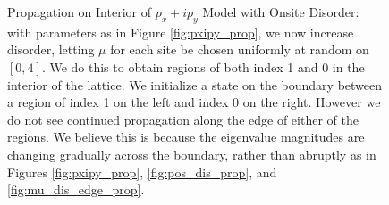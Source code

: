 \documentclass[a4paper]{article}
\begin{document}
\begin{figure}
%
%

%
%
\caption{Propagation on Interior of $p_x + ip_y$ Model with Onsite Disorder: with parameters as in Figure \ref{fig:pxipy_prop}, we now increase disorder, letting $\mu$ for each site be chosen uniformly at random on $[0,4]$.
We do this to obtain regions of both index 1 and 0 in the interior of the lattice.
We initialize a state on the boundary between a region of index 1 on the left and index 0 on the right.
However we do not see continued propagation along the edge of either of the regions.
We believe this is because the eigenvalue magnitudes are changing gradually across the boundary, rather than abruptly as in Figures \ref{fig:pxipy_prop},  \ref{fig:pos_dis_prop}, and \ref{fig:mu_dis_edge_prop}.
}%
\label{fig:mu_dis_interior_prop}%
\end{figure}
\end{document}
